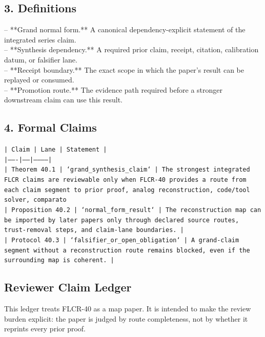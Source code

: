 \documentclass[11pt]{article}
\begin{document}
\subsection*{3. Definitions}

\noindent{}-- **Grand normal form.** A canonical dependency-explicit statement of the integrated series claim.\\
\noindent{}-- **Synthesis dependency.** A required prior claim, receipt, citation, calibration datum, or falsifier lane.\\
\noindent{}-- **Receipt boundary.** The exact scope in which the paper's result can be replayed or consumed.\\
\noindent{}-- **Promotion route.** The evidence path required before a stronger downstream claim can use this result.\\

\subsection*{4. Formal Claims}

\noindent\texttt{| Claim | Lane | Statement |}\\
\noindent\texttt{|-------|------|-----------|}\\
\noindent\texttt{| Theorem 40.1 | `grand\_synthesis\_claim` | The strongest integrated FLCR claims are reviewable only when FLCR-40 provides a route from each claim segment to prior proof, analog reconstruction, code/tool solver, comparato}\\
\noindent\texttt{| Proposition 40.2 | `normal\_form\_result` | The reconstruction map can be imported by later papers only through declared source routes, trust-removal steps, and claim-lane boundaries. |}\\
\noindent\texttt{| Protocol 40.3 | `falsifier\_or\_open\_obligation` | A grand-claim segment without a reconstruction route remains blocked, even if the surrounding map is coherent. |}\\


\subsection*{Reviewer Claim Ledger}

This ledger treats FLCR-40 as a map paper. It is intended to make the review burden explicit: the paper is judged by route completeness, not by whether it reprints every prior proof.
\end{document}
